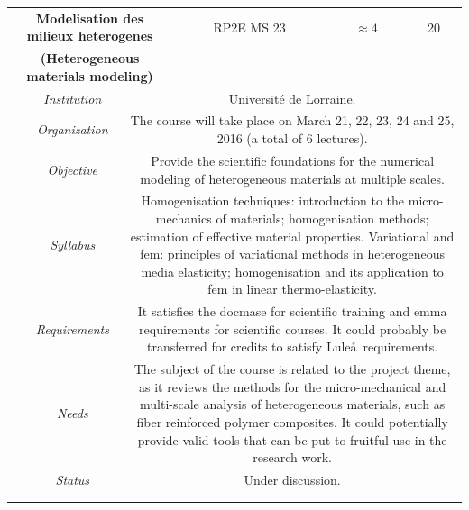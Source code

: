 \documentclass[a4paper, twoside,12pt, abstract]{scrartcl} %
\begin{document}
\begin{center}
\begin{longtable}{cccccc}
    \multicolumn{3}{p{0.5\textwidth}}{\textbf{Modelisation des milieux heterogenes}}&RP2E MS 23&$\approx4$&20\\
    \multicolumn{3}{p{0.5\textwidth}}{\textbf{(Heterogeneous materials modeling)}}&&&\\
    &\textit{Institution}&\multicolumn{4}{p{0.7\textwidth}}{Universit\'e de Lorraine.}\\
    &\textit{Organization}&\multicolumn{4}{p{0.7\textwidth}}{The course will take place on March 21, 22, 23, 24 and 25, 2016 (a total of 6 lectures).}\\
    &\textit{Objective}&\multicolumn{4}{p{0.7\textwidth}}{Provide the scientific foundations for the numerical modeling of heterogeneous materials at multiple scales.}\\
    &\textit{Syllabus}&\multicolumn{4}{p{0.7\textwidth}}{Homogenisation techniques: introduction to the micro-mechanics of materials; homogenisation methods; estimation of effective material properties. Variational and \acrfull{fem}: principles of variational methods in heterogeneous media elasticity; homogenisation and its application to \acrshort{fem} in linear thermo-elasticity.}\\
    &\textit{Requirements}&\multicolumn{4}{p{0.7\textwidth}}{It satisfies the \acrshort{docmase} for scientific training and \acrshort{emma} requirements for scientific courses. It could probably be transferred for credits to satisfy Lule\aa\ requirements.}\\
    &\textit{Needs}&\multicolumn{4}{p{0.7\textwidth}}{The subject of the course is related to the project theme, as it reviews the methods for the micro-mechanical and multi-scale analysis of heterogeneous materials, such as fiber reinforced polymer composites. It could potentially provide valid tools that can be put to fruitful use in the research work.}\\
    &\textit{Status}&\multicolumn{4}{p{0.7\textwidth}}{Under discussion.}\\
    &&&&&\\
    \bottomrule
\label{tab:proposal_tab}  
\end{longtable}%
\end{center}

%
%
%
\end{document}
